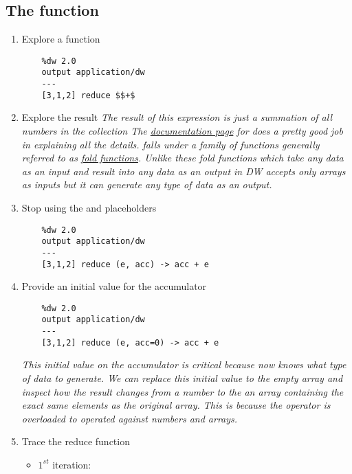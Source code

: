 \subsection{The  function}
\begin{enumerate}[resume*]
\item Explore a  function
  \begin{lstlisting}
    %dw 2.0
    output application/dw
    ---
    [3,1,2] reduce $$+$
  \end{lstlisting}
\item Explore the result
  \newline
  \emph{
    The result of this expression is just a summation of all numbers in the collection
    \newline
    The \href{https://docs.mulesoft.com/mule-runtime/4.3/dw-core-functions-reduce}{documentation page} for  does a pretty good job in explaining all the details.
    \newline
     falls under a family of functions generally referred to as \href{https://en.wikipedia.org/wiki/Fold_(higher-order_function)}{fold functions}.  Unlike these fold functions which take any data as an input and result into any data as an output  in DW accepts only arrays as inputs but it can generate any type of data as an output.
  }
\item Stop using the \ttt{\$} and \ttt{\$\$} placeholders
  \begin{lstlisting}
    %dw 2.0
    output application/dw
    ---
    [3,1,2] reduce (e, acc) -> acc + e    
  \end{lstlisting}
\item Provide an initial value for the accumulator
  \begin{lstlisting}
    %dw 2.0
    output application/dw
    ---
    [3,1,2] reduce (e, acc=0) -> acc + e
  \end{lstlisting}
  \emph{
    This initial value on the accumulator is critical because now  knows what type of data to generate.  We can replace this initial value to the empty array and inspect how the result changes from a number to the an array containing the exact same elements as the original array.  This is because the \ttt{+} operator is overloaded to operated against numbers and arrays.
  }
\item Trace the reduce function
  \begin{itemize}
  \item $1^{st}$ iteration: 

\end{itemize}
\end{enumerate}
